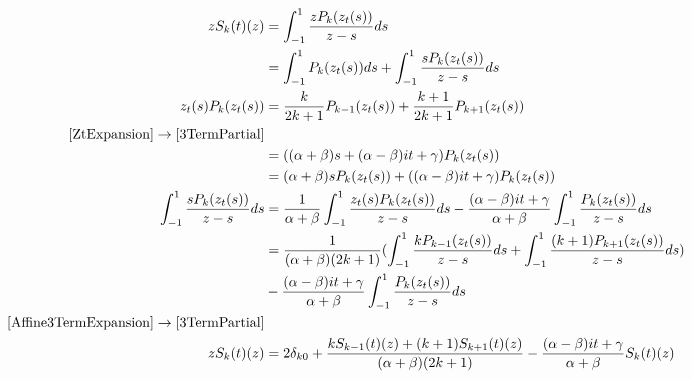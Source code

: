 \documentclass{article}
\begin{document}
\begin{align}
zS_k(t)(z) &= \int_{-1}^1\frac{zP_k(z_t(s))}{z-s}ds\\
&= \int_{-1}^1P_k(z_t(s))ds+\int_{-1}^1\frac{sP_k(z_t(s))}{z-s}ds
\label{3TermPartial}\\
z_t(s)P_k(z_t(s))&=\frac{k}{2k+1}P_{k-1}(z_t(s))+\frac{k+1}{2k+1}P_{k+1}(z_t(s)) \\
\eqref{ZtExpansion} \rightarrow \eqref{3TermPartial}&\\\:
&= ((\alpha+\beta)s+(\alpha-\beta)it+\gamma)P_k(z_t(s))\\
&=(\alpha+\beta)sP_k(z_t(s))+
((\alpha-\beta)it+\gamma)P_k(z_t(s))\\
\int_{-1}^1\frac{sP_k(z_t(s))}{z-s}ds &=
\frac{1}{\alpha+\beta}\int_{-1}^1\frac{z_t(s)P_k(z_t(s))}{z-s}ds-
\frac{(\alpha-\beta)it+\gamma}{\alpha+\beta}\int_{-1}^1\frac{P_k(z_t(s))}{z-s}ds \\
&=\frac{1}{(\alpha+\beta)(2k+1)}(\int_{-1}^1\frac{kP_{k-1}(z_t(s))}{z-s}ds+
\int_{-1}^1\frac{(k+1)P_{k+1}(z_t(s))}{z-s}ds) \\
&-\frac{(\alpha-\beta)it+\gamma}{\alpha+\beta}\int_{-1}^1\frac{P_k(z_t(s))}{z-s}ds \label{Affine3TermExpansion} \\
\eqref{Affine3TermExpansion}\rightarrow\eqref{3TermPartial}&\\
zS_k(t)(z) &= 2\delta_{k0}+ \frac{kS_{k-1}(t)(z)+(k+1)S_{k+1}(t)(z)}{(\alpha+\beta)(2k+1)}
-\frac{(\alpha-\beta)it+\gamma}{\alpha+\beta}S_k(t)(z)
\end{align}
\end{document}
